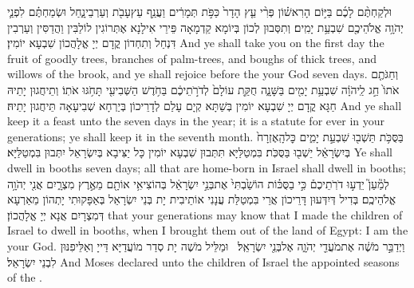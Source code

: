 {וּלְקַחְתֶּ֨ם לָכֶ֜ם בַּיּ֣וֹם הָרִאשׁ֗וֹן פְּרִ֨י עֵ֤ץ הָדָר֙ כַּפֹּ֣ת תְּמָרִ֔ים וַעֲנַ֥ף עֵץ\maqqaf עָבֹ֖ת וְעַרְבֵי\maqqaf נָ֑חַל וּשְׂמַחְתֶּ֗ם לִפְנֵ֛י יְהֹוָ֥ה אֱלֹהֵיכֶ֖ם שִׁבְעַ֥ת יָמִֽים׃}
{וְתִסְּבוּן לְכוֹן בְּיוֹמָא קַדְמָאָה פֵּירֵי אִילָנָא אֶתְּרוֹגִין לוֹלַבִּין וַהֲדַסִּין וְעַרְבִין דִּנְחַל וְתִחְדוֹן קֳדָם יְיָ אֱלָהֲכוֹן שִׁבְעָא יוֹמִין׃}
{And ye shall take you on the first day the fruit of goodly trees, branches of palm-trees, and boughs of thick trees, and willows of the brook, and ye shall rejoice before the \lord\space your God seven days.}{}
{וְחַגֹּתֶ֤ם אֹתוֹ֙ חַ֣ג לַֽיהֹוָ֔ה שִׁבְעַ֥ת יָמִ֖ים בַּשָּׁנָ֑ה חֻקַּ֤ת עוֹלָם֙ לְדֹרֹ֣תֵיכֶ֔ם בַּחֹ֥דֶשׁ הַשְּׁבִיעִ֖י תָּחֹ֥גּוּ אֹתֽוֹ׃}
{וְתֵיחֲגוּן יָתֵיהּ חַגָּא קֳדָם יְיָ שִׁבְעָא יוֹמִין בְּשַׁתָּא קְיָם עָלַם לְדָרֵיכוֹן בְּיַרְחָא שְׁבִיעָאָה תֵּיחֲגוּן יָתֵיהּ׃}
{And ye shall keep it a feast unto the \lord\space seven days in the year; it is a statute for ever in your generations; ye shall keep it in the seventh month.}{}
{בַּסֻּכֹּ֥ת תֵּשְׁב֖וּ שִׁבְעַ֣ת יָמִ֑ים כׇּל\maqqaf הָֽאֶזְרָח֙ בְּיִשְׂרָאֵ֔ל יֵשְׁב֖וּ בַּסֻּכֹּֽת׃}
{בִּמְטַלַּיָּא תִּתְּבוּן שִׁבְעָא יוֹמִין כָּל יַצִּיבָא בְּיִשְׂרָאֵל יִתְּבוּן בִּמְטַלַּיָּא׃}
{Ye shall dwell in booths seven days; all that are home-born in Israel shall dwell in booths;}{}
{לְמַ֘עַן֮ יֵדְע֣וּ דֹרֹֽתֵיכֶם֒ כִּ֣י בַסֻּכּ֗וֹת הוֹשַׁ֙בְתִּי֙ אֶת\maqqaf בְּנֵ֣י יִשְׂרָאֵ֔ל בְּהוֹצִיאִ֥י אוֹתָ֖ם מֵאֶ֣רֶץ מִצְרָ֑יִם אֲנִ֖י יְהֹוָ֥ה אֱלֹהֵיכֶֽם׃}
{בְּדִיל דְּיִדְּעוּן דָּרֵיכוֹן אֲרֵי בִּמְטַלַּת עֲנָנִי אוֹתֵיבִית יָת בְּנֵי יִשְׂרָאֵל בְּאַפָּקוּתִי יָתְהוֹן מֵאַרְעָא דְּמִצְרָיִם אֲנָא יְיָ אֱלָהֲכוֹן׃}
{that your generations may know that I made the children of Israel to dwell in booths, when I brought them out of the land of Egypt: I am the \lord\space your God.}{}
{וַיְדַבֵּ֣ר מֹשֶׁ֔ה אֶת\maqqaf מֹעֲדֵ֖י יְהֹוָ֑ה אֶל\maqqaf בְּנֵ֖י יִשְׂרָאֵֽל׃ \petucha }
{וּמַלֵּיל מֹשֶׁה יָת סְדַר מוֹעֲדַיָּא דַּייָ וְאַלֵּיפִנּוּן לִבְנֵי יִשְׂרָאֵל׃}
{And Moses declared unto the children of Israel the appointed seasons of the \lord.}{}

